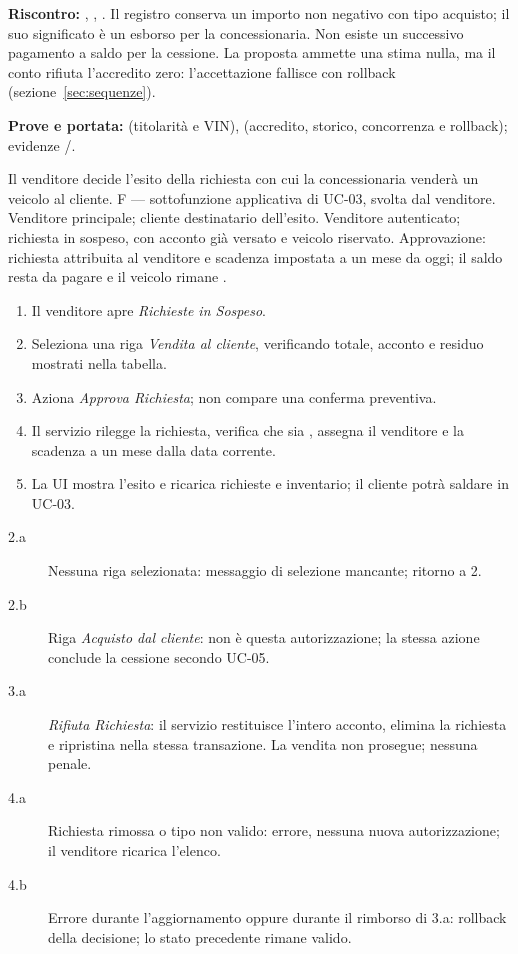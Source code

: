 \begin{flushleft}\textbf{Riscontro:} ,
, . Il registro conserva
un importo non negativo con tipo acquisto; il suo significato \`e un esborso
per la concessionaria. Non esiste un successivo pagamento a saldo per la cessione.
La proposta ammette una stima nulla, ma il conto rifiuta l'accredito zero:
l'accettazione fallisce con rollback (sezione~\ref{sec:sequenze}).\end{flushleft}


\begin{flushleft}\noindent\textbf{Prove e portata:}  (titolarità e VIN),  (accredito, storico, concorrenza e rollback); evidenze /.\end{flushleft}
\clearpage
{}
{Il venditore decide l'esito della richiesta con cui la concessionaria vender\`a un veicolo al cliente.}
{F --- sottofunzione applicativa di UC-03, svolta dal venditore.}
{Venditore principale; cliente destinatario dell'esito.}
{Venditore autenticato; richiesta  in sospeso, con acconto gi\`a versato e veicolo riservato.}
{Approvazione: richiesta attribuita al venditore e scadenza impostata a un mese da oggi;
il saldo resta da pagare e il veicolo rimane .}
\principale
\begin{enumerate}
\item Il venditore apre \emph{Richieste in Sospeso}.
\item Seleziona una riga \emph{Vendita al cliente}, verificando totale,
  acconto e residuo mostrati nella tabella.
\item Aziona \emph{Approva Richiesta}; non compare una conferma preventiva.
\item Il servizio rilegge la richiesta, verifica che sia ,
  assegna il venditore e la scadenza a un mese dalla data corrente.
\item La UI mostra l'esito e ricarica richieste e inventario;
  il cliente potr\`a saldare in UC-03.
\end{enumerate}
\alternative
\begin{description}
\item[2.a] Nessuna riga selezionata: messaggio di selezione mancante; ritorno a 2.
\item[2.b] Riga \emph{Acquisto dal cliente}: non \`e questa autorizzazione;
  la stessa azione conclude la cessione secondo UC-05.
\item[3.a] \emph{Rifiuta Richiesta}: il servizio restituisce l'intero acconto,
  elimina la richiesta e ripristina  nella stessa transazione.
  La vendita non prosegue; nessuna penale.
\item[4.a] Richiesta rimossa o tipo non valido: errore, nessuna nuova autorizzazione;
  il venditore ricarica l'elenco.
\item[4.b] Errore durante l'aggiornamento oppure durante il rimborso di 3.a:
  rollback della decisione; lo stato precedente rimane valido.
\end{description}
